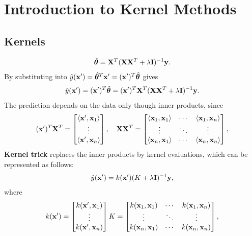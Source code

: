 \chapter{Introduction to Kernel Methods}

\section{Kernels}
\begin{align*}
	\hat{\boldsymbol{\theta}} = \mathbf{X}^T(\mathbf{X}\mathbf{X}^T+\lambda\mathbf{I})^{-1}{\mathbf{y}}.
\end{align*}
By substituting into $\hat{y}({\mathbf{x}}') = \hat{\boldsymbol{\theta}}^T{\mathbf{x}}' = ({\mathbf{x}}')^T\hat{\boldsymbol{\theta}}$ gives
\begin{align*}
	\hat{y}({\mathbf{x}}') = ({\mathbf{x}}')^T\hat{\boldsymbol{\theta}} = ({\mathbf{x}}')^T\mathbf{X}^T(\mathbf{X}\mathbf{X}^T+\lambda\mathbf{I})^{-1}{\mathbf{y}}.
\end{align*}
The prediction depends on the data only though inner products, since
\begin{align*}
	({\mathbf{x}}')^T\mathbf{X}^T = \begin{bmatrix}
		\langle {\mathbf{x}}', {\mathbf{x}}_1 \rangle\\
		\vdots\\
		\langle {\mathbf{x}}', {\mathbf{x}}_n \rangle
	\end{bmatrix}, \quad
	\mathbf{X}\mathbf{X}^T = \begin{bmatrix}
		\langle {\mathbf{x}}_1, {\mathbf{x}}_1 \rangle & \cdots & \langle {\mathbf{x}}_1, {\mathbf{x}}_n \rangle\\
		\vdots & \ddots & \vdots\\
		\langle {\mathbf{x}}_n, {\mathbf{x}}_1 \rangle & \cdots & \langle {\mathbf{x}}_n, {\mathbf{x}}_n \rangle
	\end{bmatrix},
\end{align*}
\textbf{Kernel trick} replaces the inner products by kernel evaluations, which can be represented as follows:
\begin{align*}
	\hat{y}({\mathbf{x}}') = k({\mathbf{x}}')(K+\lambda \mathbf{I})^{-1}{\mathbf{y}},
\end{align*}
where 
\begin{align*}
	k({\mathbf{x}}') = \begin{bmatrix}
		k({\mathbf{x}}', {\mathbf{x}}_1)\\
		\vdots\\
		k({\mathbf{x}}', {\mathbf{x}}_n)
	\end{bmatrix}
	K = \begin{bmatrix}
		k({\mathbf{x}}_1, {\mathbf{x}}_1) & \cdots & k({\mathbf{x}}_1, {\mathbf{x}}_n)\\
		\vdots & \ddots & \vdots\\
		k({\mathbf{x}}_n, {\mathbf{x}}_1) & \cdots & k({\mathbf{x}}_n, {\mathbf{x}}_n)
	\end{bmatrix},
\end{align*}

